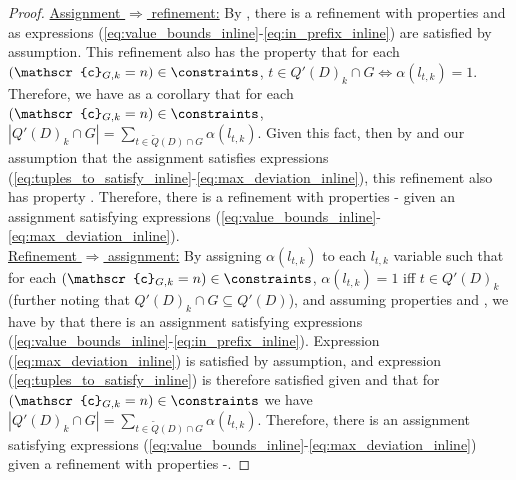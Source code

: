 \begin{proof}
    \underline{Assignment $\Longrightarrow$ refinement:} By , there is a refinement with properties  and  as expressions (\ref{eq:value_bounds_inline}-\ref{eq:in_prefix_inline}) are satisfied by assumption. This refinement also has the property that for each $(\mathscr{c}_{G, k} = n) \in \constraints$, $t \in Q'(D)_k \cap G \iff \alpha(l_{t, k}) = 1$. Therefore, we have as a corollary that for each $(\mathscr{c}_{G, k} = n) \in \constraints$, $|Q'(D)_k \cap G| = \sum_{t \in \widetilde{Q}(D) \cap G}\alpha(l_{t, k})$. Given this fact, then by  and our assumption that the assignment satisfies expressions (\ref{eq:tuples_to_satisfy_inline}-\ref{eq:max_deviation_inline}), this refinement also has property . Therefore, there is a refinement with properties - given an assignment satisfying expressions (\ref{eq:value_bounds_inline}-\ref{eq:max_deviation_inline}).\\
    \indent \underline{Refinement $\Longrightarrow$ assignment:} By assigning $\alpha(l_{t, k})$ to each $l_{t, k}$ variable such that for each $(\mathscr{c}_{G, k} = n) \in \constraints$, $\alpha(l_{t, k}) = 1$ iff $t \in Q'(D)_k$ (further noting that $Q'(D)_k \cap G \subseteq Q'(D)$), and assuming properties  and , we have by  that there is an assignment satisfying expressions (\ref{eq:value_bounds_inline}-\ref{eq:in_prefix_inline}). Expression (\ref{eq:max_deviation_inline}) is satisfied by assumption, and expression (\ref{eq:tuples_to_satisfy_inline}) is therefore satisfied given  and that for $(\mathscr{c}_{G, k} = n) \in \constraints$ we have $|Q'(D)_k \cap G| = \sum_{t \in \widetilde{Q}(D) \cap G}\alpha(l_{t, k})$. Therefore, there is an assignment satisfying expressions (\ref{eq:value_bounds_inline}-\ref{eq:max_deviation_inline}) given a refinement with properties -. 

\end{proof}
